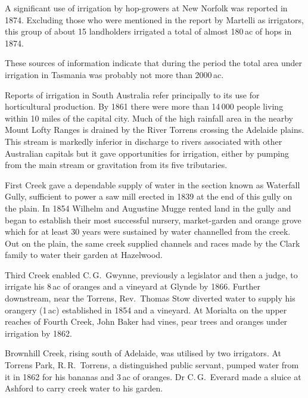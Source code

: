 A significant use of irrigation by hop-growers at New Norfolk was
reported in 1874.  Excluding those who were mentioned in the report by
Martelli as irrigators, this group of about 15 landholders irrigated a
total of almost 180\,ac of hops in 1874.

These sources of information indicate that during the period the total
area under irrigation in Tasmania was probably not more than
2000\,ac.

Reports of irrigation in South Australia refer principally to its use
for horticultural production.  By 1861 there were more than 14\,000
people living within 10 miles of the capital city.  Much of the high
rainfall area in the nearby Mount Lofty Ranges is drained by the River
Torrens crossing the Adelaide plains.  This stream is markedly
inferior in discharge to rivers associated with other Australian
capitals but it gave opportunities for irrigation, either by pumping
from the main stream or gravitation from its five
tributaries.

First Creek gave a dependable supply of water in the section known as
Waterfall Gully, sufficient to power a saw mill erected in 1839 at the
end of this gully on the plain.  In 1854 Wilhelm and Augustine Mugge
rented land in the gully and began to establish their most successful
nursery, market-garden and orange grove which for at least 30 years
were sustained by water channelled from the creek.  Out on the plain,
the same creek supplied channels and races made by the Clark family to
water their garden at Hazelwood.

Third Creek enabled C.\,G.~Gwynne, previously a legislator and then a
judge, to irrigate his 8\,ac of oranges and a vineyard at Glynde by
1866.  Further downstream, near the Torrens, Rev.\ Thomas Stow
diverted water to supply his orangery (1\,ac) established in 1854 and
a vineyard.  At Morialta on the upper reaches of Fourth Creek, John
Baker had vines, pear trees and oranges under irrigation by
1862.

Brownhill Creek, rising south of Adelaide, was utilised by two
irrigators.  At Torrens Park, R.\,R.~Torrens, a distinguished public
servant, pumped water from it in 1862 for his bananas and 3\,ac of
oranges.  Dr C.\,G.~Everard made a sluice at Ashford to carry creek
water to his garden.

